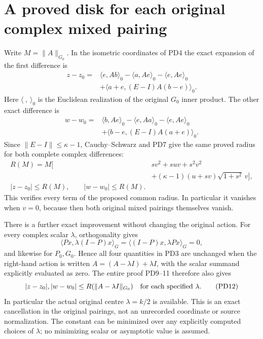 \documentclass[11pt]{article}
\begin{document}
\section{A proved disk for each original complex mixed pairing}
Write $M=\|A\|_{G_0}$.  In the isometric coordinates of PD4 the
exact expansion of the first difference is
\[
 \begin{split}
 z-z_0={}&\langle e,Ab\rangle_0-\langle a,Ae\rangle_0
              -\langle e,Ae\rangle_0\\
          &+\langle a+e,(E-I)A(b-e)\rangle_0.
 \end{split}                                                      \tag{PD9}
\]
Here $\langle\ ,\ \rangle_0$ is the Euclidean realization of
the original $G_0$ inner product.  The other exact difference is
\[
 \begin{split}
 w-w_0={}&\langle b,Ae\rangle_0-\langle e,Aa\rangle_0
              -\langle e,Ae\rangle_0\\
          &+\langle b-e,(E-I)A(a+e)\rangle_0.
 \end{split}                                                      \tag{PD10}
\]
Since $\|E-I\|\le\kappa-1$, Cauchy--Schwarz and PD7 give the
same proved radius for both complete complex differences:
\[
 \begin{split}
 R(M) =M\bigl[&s v^2+suv+s^2v^2\\
                &+(\kappa-1)(u+sv)\sqrt{1+s^2}\,v\bigr],\\
 \boxed{|z-z_0|\le R(M),\qquad |w-w_0|\le R(M).}
 \end{split}                                                      \tag{PD11}
\]
This verifies every term of the proposed common radius.  In
particular it vanishes when $v=0$, because then both original
mixed pairings themselves vanish.

There is a further exact improvement without changing the original
action.  For every complex scalar $\lambda$, orthogonality gives
\[
 \langle Px,\lambda(I-P)x\rangle_G
 =\langle(I-P)x,\lambda Px\rangle_G=0,
\]
and likewise for $P_0,G_0$.  Hence all four quantities in PD3
are unchanged when the right-hand action is written
$A=(A-\lambda I)+\lambda I$, with the scalar summand explicitly
evaluated as zero.  The entire proof PD9--11 therefore also gives
\[
 |z-z_0|,|w-w_0|\le R(\|A-\lambda I\|_{G_0})
                  \quad\hbox{for each specified }\lambda.       \tag{PD12}
\]
In particular the actual original centre $\lambda=k/2$ is available.
This is an exact cancellation in the original pairings, not an
unrecorded coordinate or source normalization.  The constant can
be minimized over any explicitly computed choices of $\lambda$;
no minimizing scalar or asymptotic value is assumed.
\end{document}
